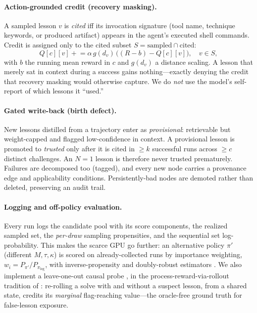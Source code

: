 \documentclass[10pt,twocolumn]{article}
\begin{document}
\paragraph{Action-grounded credit (recovery masking).}
A sampled lesson $v$ is \emph{cited} iff its invocation signature (tool name,
technique keywords, or produced artifact) appears in the agent's executed shell
commands. Credit is assigned only to the cited subset $S=\text{sampled}\cap
\text{cited}$:
\begin{equation}
Q[c][v] \mathrel{+}= \alpha\,g(d_v)\,\big((R-b)-Q[c][v]\big),\quad v\in S,
\end{equation}
with $b$ the running mean reward in $c$ and $g(d_v)$ a distance scaling. A lesson
that merely sat in context during a success gains nothing---exactly denying the
credit that recovery masking would otherwise capture. We do \emph{not} use the
model's self-report of which lessons it ``used.''

\paragraph{Gated write-back (birth defect).}
New lessons distilled from a trajectory enter as \emph{provisional}: retrievable
but weight-capped and flagged low-confidence in context. A provisional lesson is
promoted to \emph{trusted} only after it is cited in $\ge k$ successful runs across
$\ge c$ distinct challenges. An $N{=}1$ lesson is therefore never trusted
prematurely. Failures are decomposed too (tagged), and every new node carries a
provenance edge and applicability conditions. Persistently-bad nodes are demoted
rather than deleted, preserving an audit trail.

\paragraph{Logging and off-policy evaluation.}
Every run logs the candidate pool with its score components, the realized
sampled set, the \emph{per-draw} sampling propensities, and the sequential set
log-probability. This makes the scarce GPU go further: an alternative policy
$\pi'$ (different $M,\tau,\kappa$) is scored on already-collected runs by
importance weighting, $w_i=P_{\pi'}/P_{\pi_{\log}}$, with inverse-propensity and
doubly-robust estimators \citep{OfflineEval,DoublyRobust}. We also implement a
leave-one-out causal probe \citep{MemoryR2}, in the process-reward-via-rollout
tradition of \citet{MathShepherd}: re-rolling a solve with
and without a suspect lesson, from a shared state, credits its \emph{marginal}
flag-reaching value---the oracle-free ground truth for false-lesson exposure.
\end{document}
